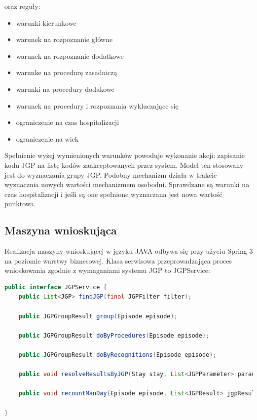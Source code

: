 oraz reguły:
\begin{itemize}
 \item warunki kierunkowe
 \item warunek na rozpoznanie główne
 \item warunek na rozpoznanie dodatkowe
 \item warunke na procedurę zasadniczą
 \item warunki na procedury dodakowe
 \item warunek na procedury i rozpoznania wykluczające się	
 \item ograniczenie na czas hospitalizacji
 \item ograniczenie na wiek
\end{itemize}
Spełnienie wyżej wymienionych warunków powoduje wykonanie akcji: zapisanie kodu JGP na listę kodów zaakceptowanych przez system. Model ten stosowany jest do wyznaczania grupy JGP.
Podobny mechanizm działa w trakcie wyznacznia nowych wartości mechanizmem osobodni.
Sprawdzane są warunki na czas hospitalizacji i jeśli są one spełnione wyznaczana jest nowa wartość punktowa.

\subsection{Maszyna wnioskująca}
\label{sec:maszynaWnioskujaca}
Realizacja maszyny wnioskującej w języku JAVA odbywa się przy użyciu Spring 3 na poziomie warstwy biznesowej. Klasa serwisowa przeprowadzająca proces wnioskowania zgodnie z wymaganiami systemu JGP to JGPService:

\begin{lstlisting}[language=Java]
public interface JGPService {
    public List<JGP> findJGP(final JGPFilter filter);

    public JGPGroupResult group(Episode episode);

    public JGPGroupResult doByProcedures(Episode episode);

    public JGPGroupResult doByRecognitions(Episode episode);

    public void resolveResultsByJGP(Stay stay, List<JGPParameter> parameters, JGPGroupResult jgpGroupResult);

    public void recountManDay(Episode episode, List<JGPResult> jgpResultList);

}
\end{lstlisting}

